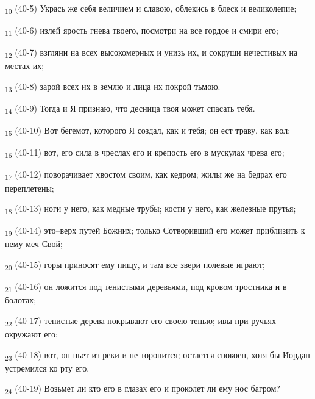 \begin{tcolorbox}
\textsubscript{10} (40-5) Укрась же себя величием и славою, облекись в блеск и великолепие;
\end{tcolorbox}
\begin{tcolorbox}
\textsubscript{11} (40-6) излей ярость гнева твоего, посмотри на все гордое и смири его;
\end{tcolorbox}
\begin{tcolorbox}
\textsubscript{12} (40-7) взгляни на всех высокомерных и унизь их, и сокруши нечестивых на местах их;
\end{tcolorbox}
\begin{tcolorbox}
\textsubscript{13} (40-8) зарой всех их в землю и лица их покрой тьмою.
\end{tcolorbox}
\begin{tcolorbox}
\textsubscript{14} (40-9) Тогда и Я признаю, что десница твоя может спасать тебя.
\end{tcolorbox}
\begin{tcolorbox}
\textsubscript{15} (40-10) Вот бегемот, которого Я создал, как и тебя; он ест траву, как вол;
\end{tcolorbox}
\begin{tcolorbox}
\textsubscript{16} (40-11) вот, его сила в чреслах его и крепость его в мускулах чрева его;
\end{tcolorbox}
\begin{tcolorbox}
\textsubscript{17} (40-12) поворачивает хвостом своим, как кедром; жилы же на бедрах его переплетены;
\end{tcolorbox}
\begin{tcolorbox}
\textsubscript{18} (40-13) ноги у него, как медные трубы; кости у него, как железные прутья;
\end{tcolorbox}
\begin{tcolorbox}
\textsubscript{19} (40-14) это--верх путей Божиих; только Сотворивший его может приблизить к нему меч Свой;
\end{tcolorbox}
\begin{tcolorbox}
\textsubscript{20} (40-15) горы приносят ему пищу, и там все звери полевые играют;
\end{tcolorbox}
\begin{tcolorbox}
\textsubscript{21} (40-16) он ложится под тенистыми деревьями, под кровом тростника и в болотах;
\end{tcolorbox}
\begin{tcolorbox}
\textsubscript{22} (40-17) тенистые дерева покрывают его своею тенью; ивы при ручьях окружают его;
\end{tcolorbox}
\begin{tcolorbox}
\textsubscript{23} (40-18) вот, он пьет из реки и не торопится; остается спокоен, хотя бы Иордан устремился ко рту его.
\end{tcolorbox}
\begin{tcolorbox}
\textsubscript{24} (40-19) Возьмет ли кто его в глазах его и проколет ли ему нос багром?
\end{tcolorbox}
